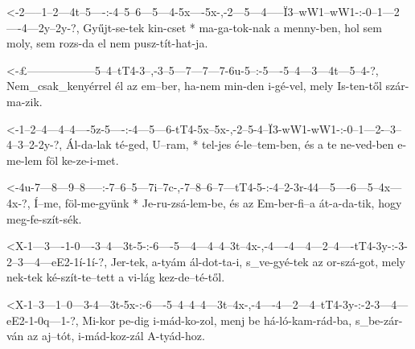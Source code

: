 
  {<-2-----1--2---4t--5----:-4--5--6---5---4-5x----5x-,-2---5---4-----Ï3--wW1--wW1-:-0--1---2----4---2y--2y-?,}
  {  Gyűjt-se-tek kin-cset * ma-ga-tok-nak a menny-ben, hol sem moly, sem rozs-da    el nem pusz-tít-hat-ja.}




  {<-£------------------5--4--tT4-3--,-3--5---7---7---7-6u-5--:-5----5--4---3---4t---5--4-?,}
  {  Nem_csak_kenyérrel él az em--ber, ha-nem min-den i-gé-vel, mely Is-ten-től szár-ma-zik.}


  {<-1--2--4---4--4----5z-5----:-4---5---6-tT4-5x--5x-,-2--5-4--Ï3-wW1-wW1-:-0--1---2-–3--4--3--2-2y-?,}
  {  Ál-da-lak té-ged, U--ram, * tel-jes é-le--tem-ben, és a te ne-ved-ben   e-me-lem föl ke-ze-i-met.}


  {<-4u-7---8---9--8-----:-7--6--5---7i--7c-,-7--8--6--7---tT4-5-:-4--2-3r-44---5----6---5--4x---4x-?,}
  {  Í--me, föl-me-gyünk * Je-ru-zsá-lem-be,  és az Em-ber-fi--a   át-a-da-tik, hogy meg-fe-szít-sék.}



  {<X-1---3----1-0----3--4---3t-5-:-6----5---4---4--4--3t--4x-,-4----4---4---2--4----tT4-3y-:-3-2--3---4---eE2-1í-1í-?,}
  {   Jer-tek, a-tyám ál-dot-ta-i,  s_ve-gyé-tek az or-szá-got, mely nek-tek ké-szít-te--tett a vi-lág kez-de--té-től.}



  {<X-1--3---1--0---3-4---3t-5x-:-6----5--4--4--4---3t--4x-,-4----4---2---4--tT4-3y-:-2-3---4---eE2-1-0q---1-?,}
  {   Mi-kor pe-dig i-mád-ko-zol, menj be há-ló-kam-rád-ba,  s_be-zár-ván az aj--tót, i-mád-koz-zál A-tyád-hoz.}

